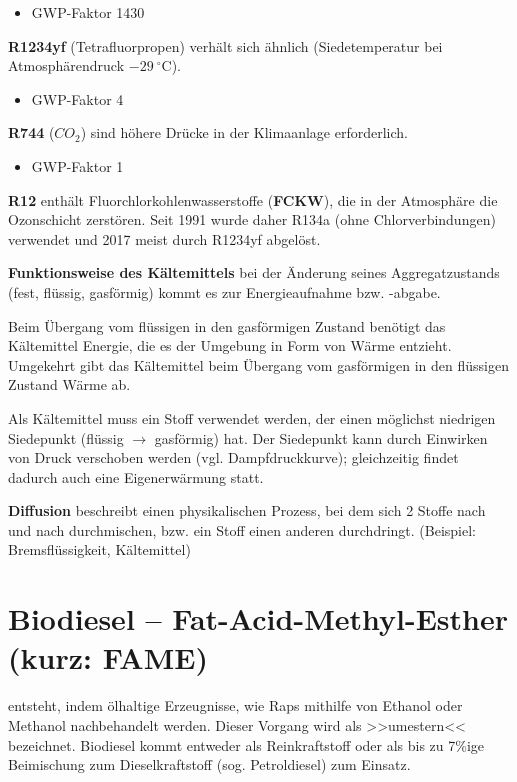 \begin{itemize}
\item
  GWP-Faktor 1430
\end{itemize}

\textbf{R1234yf} (Tetrafluorpropen) verhält sich ähnlich
(Siedetemperatur bei Atmosphärendruck $-29~^\circ\text{C}$).

\begin{itemize}
\item
  GWP-Faktor 4
\end{itemize}

\textbf{R744} ($CO_2$) sind höhere Drücke in der Klimaanlage
erforderlich.

\begin{itemize}
\item
  GWP-Faktor 1
\end{itemize}

\textbf{R12} enthält Fluorchlorkohlenwasserstoffe (\textbf{FCKW}), die
in der Atmosphäre die Ozonschicht zerstören. Seit 1991 wurde daher R134a
(ohne Chlorverbindungen) verwendet und 2017 meist durch R1234yf
abgelöst.

\textbf{Funktionsweise des Kältemittels} bei der Änderung seines
Aggregatzustands (fest, flüssig, gasförmig) kommt es zur Energieaufnahme
bzw. -abgabe.

Beim Übergang vom flüssigen in den gasförmigen Zustand benötigt das
Kältemittel Energie, die es der Umgebung in Form von Wärme entzieht.
Umgekehrt gibt das Kältemittel beim Übergang vom gasförmigen in den
flüssigen Zustand Wärme ab.

Als Kältemittel muss ein Stoff verwendet werden, der einen möglichst
niedrigen Siedepunkt (flüssig $\to$ gasförmig) hat. Der Siedepunkt
kann durch Einwirken von Druck verschoben werden (vgl. Dampfdruckkurve);
gleichzeitig findet dadurch auch eine Eigenerwärmung statt.

\textbf{Diffusion} beschreibt einen physikalischen Prozess, bei dem sich
2 Stoffe nach und nach durchmischen, bzw. ein Stoff einen anderen
durchdringt. (Beispiel: Bremsflüssigkeit, Kältemittel)

\section{Biodiesel -- Fat-Acid-Methyl-Esther (kurz:
FAME)}\label{biodiesel-fat-acid-methyl-esther-kurz-fame}

entsteht, indem ölhaltige Erzeugnisse, wie Raps mithilfe von Ethanol
oder Methanol nachbehandelt werden. Dieser Vorgang wird als >>umestern<<
bezeichnet. Biodiesel kommt entweder als Reinkraftstoff oder als bis zu
7\%ige Beimischung zum Dieselkraftstoff (sog. Petroldiesel) zum Einsatz.


